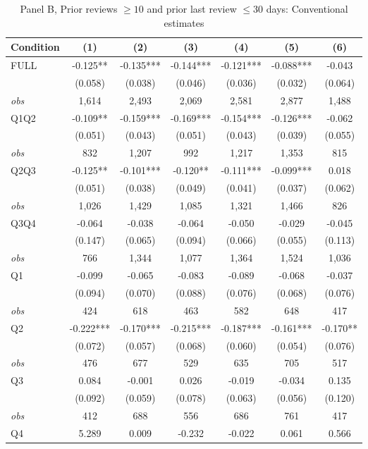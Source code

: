 \documentclass[11pt]{article}
\begin{document}
\begin{table}[!htbp]
\centering
\caption{Panel B, Prior reviews $\geq 10$ and prior last review $\leq 30$ days: Conventional estimates}
\label{tab:trim00:b:reviews_ge10_and_prior_last_review_le30d}
\small
\begin{tabular}{lcccccc}
\toprule
Condition & (1) & (2) & (3) & (4) & (5) & (6) \\
\midrule
FULL & -0.125** & -0.135*** & -0.144*** & -0.121*** & -0.088*** & -0.043 \\
 & (0.058) & (0.038) & (0.046) & (0.036) & (0.032) & (0.064) \\
\textit{obs} & 1,614 & 2,493 & 2,069 & 2,581 & 2,877 & 1,488 \\
Q1Q2 & -0.109** & -0.159*** & -0.169*** & -0.154*** & -0.126*** & -0.062 \\
 & (0.051) & (0.043) & (0.051) & (0.043) & (0.039) & (0.055) \\
\textit{obs} &   832 & 1,207 &   992 & 1,217 & 1,353 &   815 \\
Q2Q3 & -0.125** & -0.101*** & -0.120** & -0.111*** & -0.099*** & 0.018 \\
 & (0.051) & (0.038) & (0.049) & (0.041) & (0.037) & (0.062) \\
\textit{obs} & 1,026 & 1,429 & 1,085 & 1,321 & 1,466 &   826 \\
Q3Q4 & -0.064 & -0.038 & -0.064 & -0.050 & -0.029 & -0.045 \\
 & (0.147) & (0.065) & (0.094) & (0.066) & (0.055) & (0.113) \\
\textit{obs} &   766 & 1,344 & 1,077 & 1,364 & 1,524 & 1,036 \\
Q1 & -0.099 & -0.065 & -0.083 & -0.089 & -0.068 & -0.037 \\
 & (0.094) & (0.070) & (0.088) & (0.076) & (0.068) & (0.076) \\
\textit{obs} & 424 & 618 & 463 & 582 & 648 & 417 \\
Q2 & -0.222*** & -0.170*** & -0.215*** & -0.187*** & -0.161*** & -0.170** \\
 & (0.072) & (0.057) & (0.068) & (0.060) & (0.054) & (0.076) \\
\textit{obs} & 476 & 677 & 529 & 635 & 705 & 517 \\
Q3 & 0.084 & -0.001 & 0.026 & -0.019 & -0.034 & 0.135 \\
 & (0.092) & (0.059) & (0.078) & (0.063) & (0.056) & (0.120) \\
\textit{obs} & 412 & 688 & 556 & 686 & 761 & 417 \\
Q4 & 5.289 & 0.009 & -0.232 & -0.022 & 0.061 & 0.566 \\

\end{tabular}
\end{table}
\end{document}
